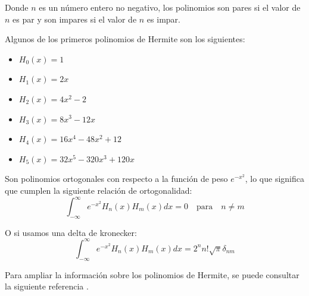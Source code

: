 \documentclass[10pt,onecolumn]{article}
\begin{document}
Donde $n$ es un número entero no negativo, los polinomios son pares si el valor de $n$ es par y son impares si el valor de $n$ es impar.

Algunos de los primeros polinomios de Hermite son los siguientes:
    \begin{itemize}
        \item $H_0(x) = 1$
        \item $H_1(x) = 2x$
        \item $H_2(x) = 4x^2 - 2$
        \item $H_3(x) = 8x^3 - 12x$
        \item $H_4(x) = 16x^4 - 48x^2 + 12$
        \item $H_5(x) = 32x^5 - 320x^3 + 120x$  
    \end{itemize}

Son polinomios ortogonales con respecto a la función de peso $e^{-x^2}$, lo que significa que cumplen la siguiente relación de ortogonalidad:
\begin{equation}
    \int_{-\infty}^{\infty} e^{-x^2} H_n(x) H_m(x) dx = 0 \quad \text{para} \quad n \neq m
\end{equation}

O si usamos una delta de kronecker:
\begin{equation}
    \int_{-\infty}^{\infty} e^{-x^2} H_n(x) H_m(x) dx = 2^n n! \sqrt{\pi} \delta_{nm}
\end{equation}

Para ampliar la información sobre los polinomios de Hermite, se puede consultar la siguiente referencia \cite{PolinomiosHermite}.





\end{document}

